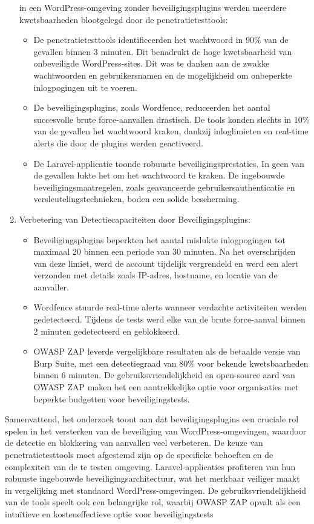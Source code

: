 \begin{enumerate}
  in een WordPress-omgeving zonder beveiligingsplugins werden meerdere kwetsbaarheden blootgelegd door de penetratietesttools:
  \begin{itemize}
    \item De penetratietesttools identificeerden het wachtwoord in 90\% van de gevallen binnen 3 minuten. Dit benadrukt de 
    hoge kwetsbaarheid van onbeveiligde WordPress-sites. Dit was te danken aan de zwakke wachtwoorden en gebruikersnamen en 
    de mogelijkheid om onbeperkte inlogpogingen uit te voeren.
    \item De beveiligingsplugins, zoals Wordfence, reduceerden het aantal succesvolle brute force-aanvallen drastisch. 
    De tools konden slechts in 10\% van de gevallen het wachtwoord kraken, dankzij inloglimieten en 
    real-time alerts die door de plugins werden geactiveerd.
    \item De Laravel-applicatie toonde robuuste beveiligingsprestaties. In geen van de gevallen lukte het om het wachtwoord 
    te kraken. De ingebouwde beveiligingsmaatregelen, zoals geavanceerde gebruikersauthenticatie en 
    versleutelingstechnieken, boden een solide bescherming.
  \end{itemize}
  \item Verbetering van Detectiecapaciteiten door Beveiligingsplugins:
  \begin{itemize}
    \item Beveiligingsplugins beperkten het aantal mislukte inlogpogingen tot maximaal 20 binnen een periode van 
    30 minuten. Na het overschrijden van deze limiet, werd de account tijdelijk vergrendeld en werd een alert 
    verzonden met details zoals IP-adres, hostname, en locatie van de aanvaller.
    \item Wordfence stuurde real-time alerts wanneer verdachte activiteiten werden gedetecteerd. Tijdens de 
    tests werd elke van de brute force-aanval binnen 2 minuten gedetecteerd en geblokkeerd.
    \item OWASP ZAP leverde vergelijkbare resultaten als de betaalde versie van Burp Suite, met een detectiegraad van 80\% 
    voor bekende kwetsbaarheden binnen 6 minuten. De gebruiksvriendelijkheid en open-source aard van OWASP ZAP maken het een 
    aantrekkelijke optie voor organisaties met beperkte budgetten voor beveiligingstests.
  \end{itemize}
\end{enumerate}

Samenvattend, het onderzoek toont aan dat beveiligingsplugins een cruciale rol spelen in het versterken van de 
beveiliging van WordPress-omgevingen, waardoor de detectie en blokkering van aanvallen veel verbeteren. 
De keuze van penetratietesttools moet afgestemd zijn op de specifieke behoeften en de complexiteit van de te 
testen omgeving. Laravel-applicaties profiteren van hun robuuste ingebouwde beveiligingsarchitectuur, wat het 
merkbaar veiliger maakt in vergelijking met standaard WordPress-omgevingen. De gebruiksvriendelijkheid van de 
tools speelt ook een belangrijke rol, waarbij OWASP ZAP opvalt als een intuïtieve en kosteneffectieve optie 
voor beveiligingstests
